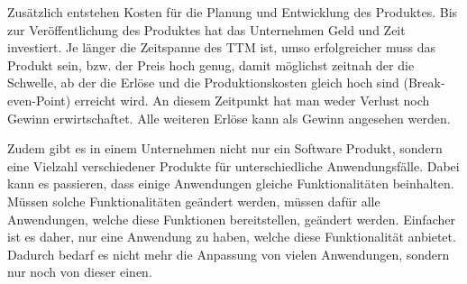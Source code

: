 Zusätzlich entstehen Kosten für die Planung und Entwicklung des Produktes. Bis zur Veröffentlichung des Produktes hat das Unternehmen Geld und Zeit investiert. Je länger die Zeitspanne des TTM ist, umso erfolgreicher muss das Produkt sein, bzw. der Preis hoch genug, damit möglichst zeitnah der die Schwelle, ab der die Erlöse und die Produktionskosten gleich hoch sind (Break-even-Point) erreicht wird. An diesem Zeitpunkt hat man weder Verlust noch Gewinn erwirtschaftet. Alle weiteren Erlöse kann als Gewinn angesehen werden.

Zudem gibt es in einem Unternehmen nicht nur ein Software Produkt, sondern eine Vielzahl verschiedener Produkte für unterschiedliche Anwendungsfälle. Dabei kann es passieren, dass einige Anwendungen gleiche Funktionalitäten beinhalten. Müssen solche Funktionalitäten geändert werden, müssen dafür alle Anwendungen, welche diese Funktionen bereitstellen, geändert werden. Einfacher ist es daher, nur eine Anwendung zu haben, welche diese Funktionalität anbietet. Dadurch bedarf es nicht mehr die Anpassung von vielen Anwendungen, sondern nur noch von dieser einen.

